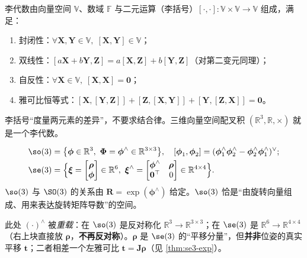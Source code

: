 \begin{definition}[李代数]\label{def:lie-algebra}
李代数由向量空间 $\mathbb{V}$、数域 $\mathbb{F}$ 与二元运算（李括号）$[\cdot,\cdot]:\mathbb{V}\times\mathbb{V}\to\mathbb{V}$ 组成，满足：
\begin{enumerate}
  \item 封闭性：$\forall \mathbf{X},\mathbf{Y}\in\mathbb{V},\;[\mathbf{X},\mathbf{Y}]\in\mathbb{V}$；
  \item 双线性：$[a\mathbf{X}+b\mathbf{Y},\mathbf{Z}]=a[\mathbf{X},\mathbf{Z}]+b[\mathbf{Y},\mathbf{Z}]$（对第二变元同理）；
  \item 自反性：$\forall\mathbf{X}\in\mathbb{V},\;[\mathbf{X},\mathbf{X}]=\mathbf{0}$；
  \item 雅可比恒等式：$[\mathbf{X},[\mathbf{Y},\mathbf{Z}]]+[\mathbf{Z},[\mathbf{X},\mathbf{Y}]]+[\mathbf{Y},[\mathbf{Z},\mathbf{X}]]=\mathbf{0}$。
\end{enumerate}
李括号“度量两元素的差异”，不要求结合律。三维向量空间配叉积 $(\mathbb{R}^3,\mathbb{R},\times)$ 就是一个李代数。
\end{definition}

\begin{definition}[$\so(3)$ 与 $\se(3)$]\label{def:so3-se3}
\begin{align}
  \so(3) &= \big\{\boldsymbol{\phi}\in\mathbb{R}^3,\ \boldsymbol{\Phi}=\boldsymbol{\phi}^\wedge\in\mathbb{R}^{3\times3}\big\},\quad
  [\boldsymbol{\phi}_1,\boldsymbol{\phi}_2]=(\boldsymbol{\phi}_1^\wedge\boldsymbol{\phi}_2^\wedge-\boldsymbol{\phi}_2^\wedge\boldsymbol{\phi}_1^\wedge)^\vee;\\
  \se(3) &= \Big\{\boldsymbol{\xi}=\begin{bmatrix}\boldsymbol{\rho}\\\boldsymbol{\phi}\end{bmatrix}\in\mathbb{R}^6,\ \boldsymbol{\xi}^\wedge=\begin{bmatrix}\boldsymbol{\phi}^\wedge&\boldsymbol{\rho}\\\mathbf{0}^\top&0\end{bmatrix}\in\mathbb{R}^{4\times4}\Big\}.
\end{align}
$\so(3)$ 与 $\SO(3)$ 的关系由 $\mathbf{R}=\exp(\boldsymbol{\phi}^\wedge)$ 给定。$\so(3)$ 恰是“由旋转向量组成、用来表达旋转矩阵导数”的空间。
\end{definition}

\begin{note}
此处 $(\cdot)^\wedge$ 被\emph{重载}：在 $\so(3)$ 是反对称化 $\mathbb{R}^3\to\mathbb{R}^{3\times3}$；在 $\se(3)$ 是 $\mathbb{R}^6\to\mathbb{R}^{4\times4}$（右上块直接放 $\boldsymbol{\rho}$，\textbf{不再反对称}）。$\boldsymbol{\rho}$ 是 $\se(3)$ 的“平移分量”，但\textbf{并非}位姿的真实平移 $\mathbf{t}$；二者相差一个左雅可比 $\mathbf{t}=\mathbf{J}\boldsymbol{\rho}$（见 \cref{thm:se3-exp}）。
\end{note}

